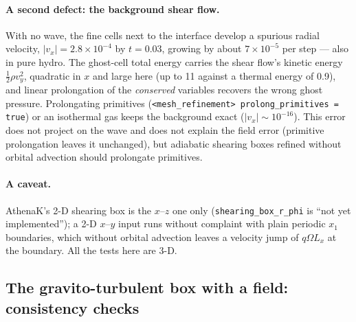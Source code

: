 \documentclass[11pt]{article}
\newcommand{\code}[1]{\texttt{#1}}
\begin{document}
\paragraph{A second defect: the background shear flow.} With no wave, the fine cells next to
the interface develop a spurious radial velocity, $|v_x| = 2.8\times10^{-4}$ by $t = 0.03$,
growing by about $7\times10^{-5}$ per step --- also in pure hydro. The ghost-cell total energy
carries the shear flow's kinetic energy $\tfrac12\rho v_y^2$, quadratic in $x$ and large here
(up to 11 against a thermal energy of 0.9), and linear prolongation of the \emph{conserved}
variables recovers the wrong ghost pressure. Prolongating primitives
(\code{<mesh\_refinement> prolong\_primitives = true}) or an isothermal gas keeps the
background exact ($|v_x| \sim 10^{-16}$). This error does not project on the wave and does not
explain the field error (primitive prolongation leaves it unchanged), but adiabatic shearing
boxes refined without orbital advection should prolongate primitives.

\paragraph{A caveat.} AthenaK's 2-D shearing box is the $x$--$z$ one only
(\code{shearing\_box\_r\_phi} is ``not yet implemented''); a 2-D $x$--$y$ input runs without
complaint with plain periodic $x_1$ boundaries, which without orbital advection leaves a
velocity jump of $q\Omega L_x$ at the boundary. All the tests here are 3-D.


\subsection{The gravito-turbulent box with a field: consistency checks}
\end{document}
